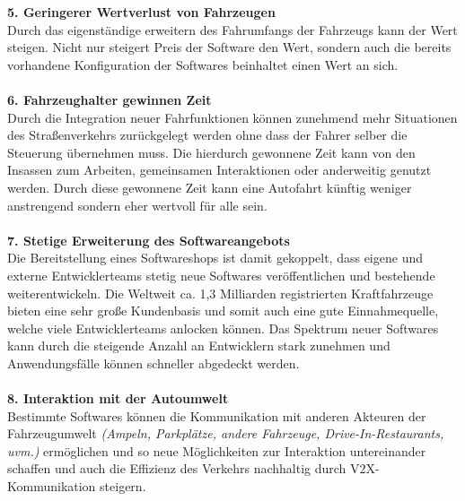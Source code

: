 \textbf{5. Geringerer Wertverlust von Fahrzeugen}\\
Durch das eigenständige erweitern des Fahrumfangs der Fahrzeugs kann der Wert steigen. Nicht nur steigert Preis der Software den Wert, sondern auch die bereits vorhandene Konfiguration der Softwares beinhaltet einen Wert an sich.\\\\
\textbf{6. Fahrzeughalter gewinnen Zeit}\\
Durch die Integration neuer Fahrfunktionen können zunehmend mehr Situationen des Straßenverkehrs zurückgelegt werden ohne dass der Fahrer selber die Steuerung übernehmen muss. Die hierdurch gewonnene Zeit kann von den Insassen zum Arbeiten, gemeinsamen Interaktionen oder anderweitig genutzt werden. Durch diese gewonnene Zeit kann eine Autofahrt künftig weniger anstrengend sondern eher wertvoll für alle sein.\\\\
\textbf{7. Stetige Erweiterung des Softwareangebots}\\
Die Bereitstellung eines Softwareshops ist damit gekoppelt, dass eigene und externe Entwicklerteams stetig neue Softwares veröffentlichen und bestehende weiterentwickeln. Die Weltweit ca. 1,3 Milliarden registrierten Kraftfahrzeuge \cite[Vgl.]{b106} bieten eine sehr große Kundenbasis und somit auch eine gute Einnahmequelle, welche viele Entwicklerteams anlocken können. Das Spektrum neuer Softwares kann durch die steigende Anzahl an Entwicklern stark zunehmen und Anwendungsfälle können schneller abgedeckt werden.\\\\
\textbf{8. Interaktion mit der Autoumwelt}\\
Bestimmte Softwares können die Kommunikation mit anderen Akteuren der Fahrzeugumwelt \textit{(Ampeln, Parkplätze, andere Fahrzeuge, Drive-In-Restaurants, uvm.)} ermöglichen und so neue Möglichkeiten zur Interaktion untereinander schaffen und auch die Effizienz des Verkehrs nachhaltig durch V2X-Kommunikation steigern. \cite[Vgl. S.19]{vda}

